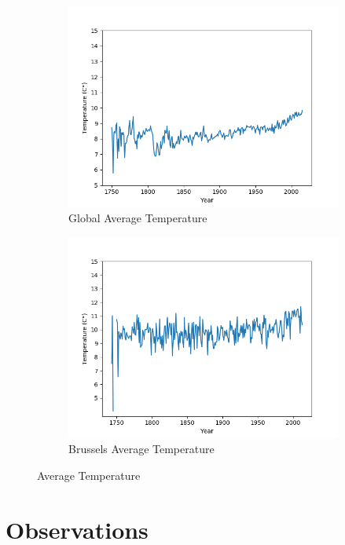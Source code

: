 \documentclass{article}
\begin{document}
\begin{figure}[H]
\centering
\begin{subfigure}[h]{0.9\linewidth}
\includegraphics[width=\linewidth]{GlobalAverageTemperature.png}
\caption{Global Average Temperature}
\end{subfigure}
\begin{subfigure}[h]{0.9\linewidth}
\includegraphics[width=\linewidth]{BrusselsAverageTemperature.png}
\caption{Brussels Average Temperature}
\end{subfigure}
\caption{Average Temperature}
\label{fig:averagetemp}
\end{figure}

\section{Observations}
\end{document}
